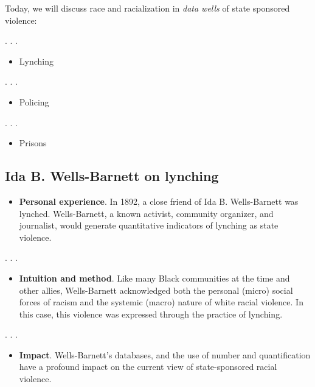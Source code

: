 \documentclass[
  letterpaper,
  DIV=11,
  numbers=noendperiod]{scrartcl}
\providecommand{\tightlist}{%
  \setlength{\itemsep}{0pt}\setlength{\parskip}{0pt}}\usepackage{longtable,booktabs,array}
\begin{document}
Today, we will discuss race and racialization in \emph{data wells} of
state sponsored violence:

. . .

\begin{itemize}
\tightlist
\item
  Lynching
\end{itemize}

. . .

\begin{itemize}
\tightlist
\item
  Policing
\end{itemize}

. . .

\begin{itemize}
\tightlist
\item
  Prisons
\end{itemize}

\hypertarget{ida-b.-wells-barnett-on-lynching}{%
\subsection{Ida B. Wells-Barnett on
lynching}\label{ida-b.-wells-barnett-on-lynching}}

\begin{itemize}
\tightlist
\item
  \textbf{Personal experience}. In 1892, a close friend of Ida B.
  Wells-Barnett was lynched. Wells-Barnett, a known activist, community
  organizer, and journalist, would generate quantitative indicators of
  lynching as state violence.
\end{itemize}

. . .

\begin{itemize}
\tightlist
\item
  \textbf{Intuition and method}. Like many Black communities at the time
  and other allies, Wells-Barnett acknowledged both the personal (micro)
  social forces of racism and the systemic (macro) nature of white
  racial violence. In this case, this violence was expressed through the
  practice of lynching.
\end{itemize}

. . .

\begin{itemize}
\tightlist
\item
  \textbf{Impact}. Wells-Barnett's databases, and the use of number and
  quantification have a profound impact on the current view of
  state-sponsored racial violence.
\end{itemize}
\end{document}
